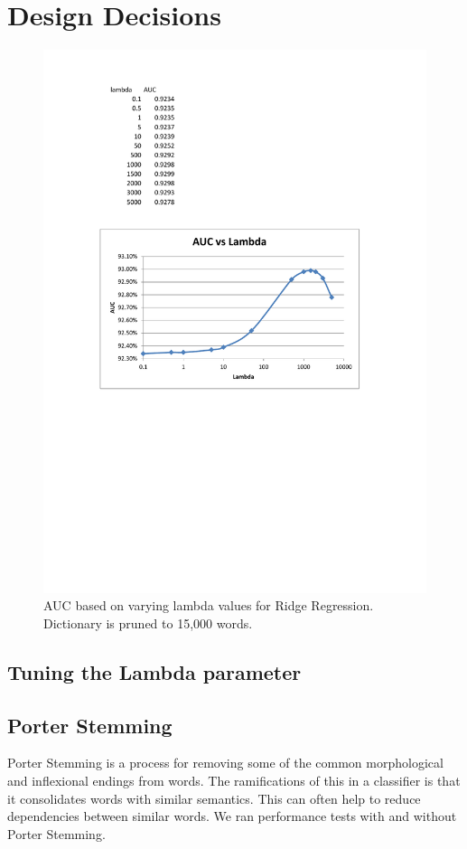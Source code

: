 \documentclass{article}
\begin{document}
\section{Design Decisions}

\begin{figure}[t]
	\centering
	\includegraphics[width=\linewidth]{files/lambda.pdf}
	\caption{AUC based on varying lambda values for Ridge Regression. Dictionary is pruned to 15,000 words.}
	\label{fig:lambda}
\end{figure}



\subsection{Tuning the Lambda parameter}

\subsection{Porter Stemming}
Porter Stemming is a process for removing some of the common morphological and inflexional endings from words. The ramifications of this in a classifier is that it consolidates words with similar semantics. This can often help to reduce dependencies between similar words. We ran performance tests with and without Porter Stemming. 
\end{document}
